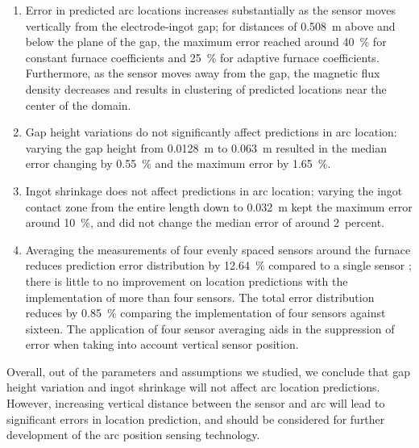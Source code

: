 \documentclass[onehalf,11pt]{beavtex}
\begin{document}
\begin{enumerate}

\item Error in predicted arc locations increases substantially as the sensor moves vertically from the electrode-ingot gap; for distances of \SI{0.508}{\meter} above and below the plane of the gap, the maximum error reached around \SI{40}{\percent} for constant furnace coefficients and \SI{25}{\percent} for adaptive furnace coefficients.
Furthermore, as the sensor moves away from the gap, the magnetic flux density decreases and results in clustering of predicted locations near the center of the domain.

\item Gap height variations do not significantly affect predictions in arc location: varying the gap height from \SI{0.0128}{\meter} to \SI{0.063}{\meter} resulted in the median error changing by \SI{0.55}{\percent} and the maximum error by \SI{1.65}{\percent}.

\item Ingot shrinkage does not affect predictions in arc location; varying the ingot contact zone from the entire length down to \SI{0.032}{\meter} kept the maximum error around \SI{10}{\percent}, and did not change the median error of around \SI{2}{percent}.

\item Averaging the measurements of four evenly spaced sensors around the furnace reduces prediction error distribution by \SI{12.64}{\percent} compared to a single sensor ; there is little to no improvement on location predictions with the implementation of more than four sensors. The total error distribution reduces by \SI{0.85}{\percent} comparing the implementation of four sensors against sixteen. The application of four sensor averaging aids in the suppression of error when taking into account vertical sensor position.

\end{enumerate}

Overall, out of the parameters and assumptions we studied, we conclude that gap height variation and ingot shrinkage will not affect arc location predictions.
However, increasing vertical distance between the sensor and arc will lead to significant errors in location prediction, and should be considered for further development of the arc position sensing technology.

\end{document}
